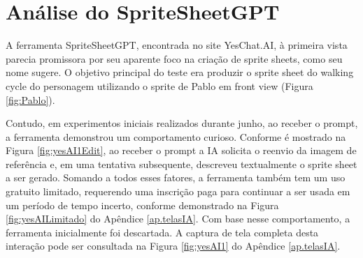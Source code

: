 \FloatBarrier
\section{Análise do SpriteSheetGPT}
\label{s.spriteSheetGPT}

A ferramenta SpriteSheetGPT, encontrada no site YesChat.AI, à primeira vista parecia promissora por seu aparente foco na criação de sprite sheets, como seu nome sugere. O objetivo principal do teste era produzir o sprite sheet do walking cycle do personagem utilizando o sprite de Pablo em front view (Figura \ref{fig:Pablo}). 

Contudo, em experimentos iniciais realizados durante junho, ao receber o prompt, a ferramenta demonstrou um comportamento curioso. Conforme é mostrado na Figura \ref{fig:yesAI1Edit}, ao receber o prompt a IA solicita o reenvio da imagem de referência e, em uma tentativa subsequente, descreveu textualmente o sprite sheet a ser gerado. Somando a todos esses fatores, a ferramenta também tem um uso gratuito limitado, requerendo uma inscrição paga para continuar a ser usada em um período de tempo incerto, conforme demonstrado na Figura \ref{fig:yesAILimitado} do Apêndice \ref{ap.telasIA}. Com base nesse comportamento, a ferramenta inicialmente foi descartada. A captura de tela completa desta interação pode ser consultada na Figura \ref{fig:yesAI1} do Apêndice \ref{ap.telasIA}.


